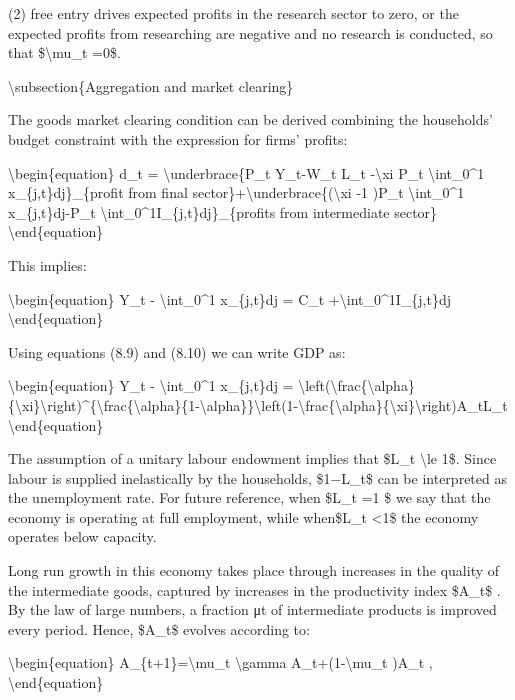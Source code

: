 \documentclass[10pt,math=newtx,citestyle=gb7714-2015,bibstyle=gb7714-2015]{elegantbook}
\begin{document}
	(2) free entry drives expected profits in the research sector to zero, or the expected profits from researching are negative and no research is conducted, so that \$\textbackslash{}mu\_t =0\$.
	
	\textbackslash{}subsection\{Aggregation and market clearing\}
	
	The goods market clearing condition can be derived combining the households’ budget constraint with the
	expression for firms’ profits:
	
	\textbackslash{}begin\{equation\}
	d\_t = \textbackslash{}underbrace\{P\_t Y\_t-W\_t L\_t -\textbackslash{}xi P\_t \textbackslash{}int\_0\^{}1 x\_\{j,t\}dj\}\_\{profit from final sector\}+\textbackslash{}underbrace\{(\textbackslash{}xi -1 )P\_t \textbackslash{}int\_0\^{}1 x\_\{j,t\}dj-P\_t \textbackslash{}int\_0\^{}1I\_\{j,t\}dj\}\_\{profits from intermediate sector\}
	\textbackslash{}end\{equation\}
	
	This implies:
	
	\textbackslash{}begin\{equation\}
	Y\_t - \textbackslash{}int\_0\^{}1 x\_\{j,t\}dj = C\_t +\textbackslash{}int\_0\^{}1I\_\{j,t\}dj
	\textbackslash{}end\{equation\}
	
	Using equations (8.9) and (8.10) we can write GDP as:
	
	\textbackslash{}begin\{equation\}
	Y\_t - \textbackslash{}int\_0\^{}1 x\_\{j,t\}dj = \textbackslash{}left(\textbackslash{}frac\{\textbackslash{}alpha\}\{\textbackslash{}xi\}\textbackslash{}right)\^{}\{\textbackslash{}frac\{\textbackslash{}alpha\}\{1-\textbackslash{}alpha\}\}\textbackslash{}left(1-\textbackslash{}frac\{\textbackslash{}alpha\}\{\textbackslash{}xi\}\textbackslash{}right)A\_tL\_t
	\textbackslash{}end\{equation\}
	
	The assumption of a unitary labour endowment implies that \$L\_t \textbackslash{}le 1\$. Since labour is supplied inelastically by the households, \$1−L\_t\$ can be interpreted as the unemployment rate. For future reference, when \$L\_t =1 \$ we say that the economy is operating at full employment, while when\$L\_t <1\$ the economy operates below capacity.
	
	Long run growth in this economy takes place through increases in the quality of the intermediate goods, captured by increases in the productivity index \$A\_t\$ . By the law of large numbers, a fraction μt of intermediate products is improved every period. Hence, \$A\_t\$ evolves according to:
	
	\textbackslash{}begin\{equation\}
	A\_\{t+1\}=\textbackslash{}mu\_t \textbackslash{}gamma A\_t+(1-\textbackslash{}mu\_t )A\_t ,
	\textbackslash{}end\{equation\}
	
\end{document}
